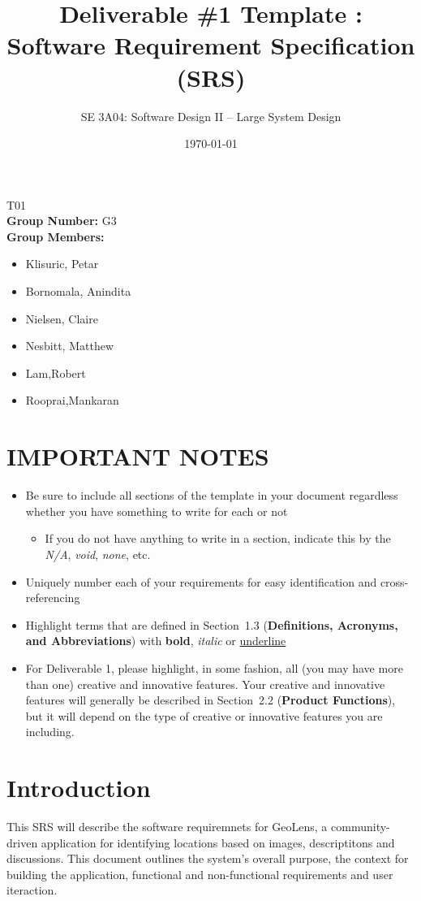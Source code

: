 \documentclass[]{article}
\title{Deliverable \#1 Template : Software Requirement Specification (SRS)}
\author{SE 3A04: Software Design II -- Large System Design}
\date{\today}
\begin{document}
\maketitle	
{} T01\\
{\bf Group Number:} G3 \\
{\bf Group Members:} 
\begin{itemize}
	\item Klisuric, Petar
    \item Bornomala, Anindita
    \item Nielsen, Claire
    \item Nesbitt, Matthew
    \item Lam,Robert 
    \item Rooprai,Mankaran
\end{itemize}

\section*{IMPORTANT NOTES}
\begin{itemize}
	\item Be sure to include all sections of the template in your document regardless whether you have something to write for each or not
	\begin{itemize}
		\item If you do not have anything to write in a section, indicate this by the \emph{N/A}, \emph{void}, \emph{none}, etc.
	\end{itemize}
	\item Uniquely number each of your requirements for easy identification and cross-referencing
	\item Highlight terms that are defined in Section~1.3 (\textbf{Definitions, Acronyms, and Abbreviations}) with \textbf{bold}, \emph{italic} or \underline{underline}
	\item For Deliverable 1, please highlight, in some fashion, all (you may have more than one) creative and innovative features. Your creative and innovative features will generally be described in Section~2.2 (\textbf{Product Functions}), but it will depend on the type of creative or innovative features you are including.
\end{itemize}

\newpage
\section{Introduction}
\label{sec:introduction}
This SRS will describe the software requiremnets for GeoLens, a community-driven application for identifying
locations based on images, descriptitons and discussions. This document outlines the system's overall purpose, the context for building the application,
functional and non-functional requirements and user iteraction.
\end{document}
